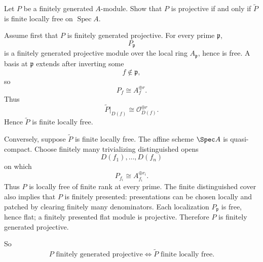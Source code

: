 \begin{problem}\label{prob:vi33-06}
Let \(P\) be a finitely generated \(A\)-module. Show that \(P\) is projective if and only if
\(\widetilde P\) is finite locally free on \(\operatorname{Spec}A\).
\end{problem}

\ifdefined\FullProblemDossiers
\begin{solution}
Assume first that \(P\) is finitely generated projective.  For every prime \(\mathfrak p\),
\[
P_{\mathfrak p}
\]
is a finitely generated projective module over the local ring \(A_{\mathfrak p}\), hence is free.  A basis at
\(\mathfrak p\) extends after inverting some
\[
f\notin\mathfrak p,
\]
so
\[
P_f\cong A_f^{\oplus r}.
\]
Thus
\[
\widetilde P|_{D(f)}
\cong
\mathcal O_{D(f)}^{\oplus r}.
\]
Hence \(\widetilde P\) is finite locally free.

Conversely, suppose \(\widetilde P\) is finite locally free.  The affine scheme \(\Spec A\) is quasi-compact.
Choose finitely many trivializing distinguished opens
\[
D(f_1),\ldots,D(f_n)
\]
on which
\[
P_{f_i}\cong A_{f_i}^{\oplus r_i}.
\]
Thus \(P\) is locally free of finite rank at every prime.  The finite distinguished cover also implies that \(P\)
is finitely presented: presentations can be chosen locally and patched by clearing finitely many denominators.
Each localization \(P_{\mathfrak p}\) is free, hence flat; a finitely presented flat module is projective.
Therefore \(P\) is finitely generated projective.

So
\[
\boxed{
P\text{ finitely generated projective}
\iff
\widetilde P\text{ finite locally free}.
}
\]
\end{solution}
\fi
